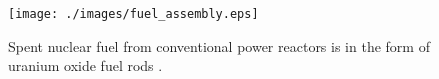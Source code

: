 \begin{figure}[htb!]
  \begin{center}
    \texttt{[image: ./images/fuel\_assembly.eps]}
  \end{center}
  \caption{Spent nuclear fuel from conventional power reactors is in the form of 
    uranium oxide fuel rods \cite{nrc_nuclear-fuel.jpg_????}.}
  \label{fig:snf}
\end{figure}

